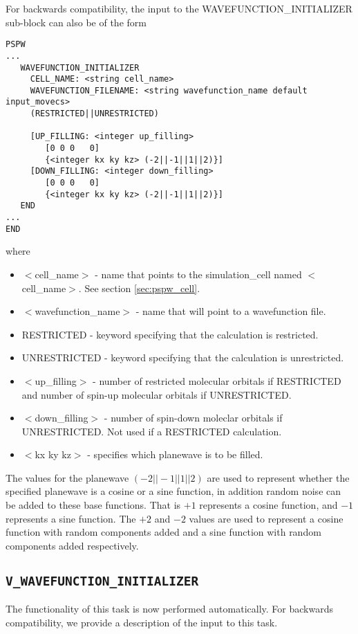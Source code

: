 For backwards compatibility, the input to the WAVEFUNCTION\_INITIALIZER 
sub-block can also be of the form
\begin{verbatim}
PSPW
... 
   WAVEFUNCTION_INITIALIZER
     CELL_NAME: <string cell_name>
     WAVEFUNCTION_FILENAME: <string wavefunction_name default input_movecs>
     (RESTRICTED||UNRESTRICTED)
     
     [UP_FILLING: <integer up_filling>
        [0 0 0   0]
        {<integer kx ky kz> (-2||-1||1||2)}]
     [DOWN_FILLING: <integer down_filling>
        [0 0 0   0]
        {<integer kx ky kz> (-2||-1||1||2)}]
   END
...
END
\end{verbatim}
where
\begin{itemize}
        \item $<$cell\_name$>$ - name that points 
                to the simulation\_cell named $<$cell\_name$>$.  See section \ref{sec:pspw_cell}.
        \item $<$wavefunction\_name$>$ - name that will point
              to a wavefunction file.
        \item RESTRICTED - keyword specifying that the calculation is restricted.
        \item UNRESTRICTED - keyword specifying that the calculation is unrestricted.
        \item $<$up\_filling$>$ - number of restricted molecular orbitals if
              RESTRICTED and number of spin-up molecular orbitals if 
              UNRESTRICTED.
        \item $<$down\_filling$>$ - number of spin-down moleclar orbitals if
              UNRESTRICTED.  Not used if a RESTRICTED calculation.
        \item $<$kx ky kz$>$ - specifies which planewave is to be filled. 
\end{itemize}

The values for the planewave $(-2||-1||1||2)$ are used to represent whether
the specified planewave is a cosine or a sine function, in addition
random noise can be added to these base functions. That is $+1$ 
represents a cosine function, and $-1$ represents a sine function.
The $+2$ and $-2$ values are used to represent a cosine function with
random components added and a sine function with random components
added respectively.  


\subsection{\tt V\_WAVEFUNCTION\_INITIALIZER}
\label{sec:pspw_v_wavefunction_initializer}
The functionality of this task is now performed automatically. For backwards 
compatibility, we provide a description of the input to this task.

